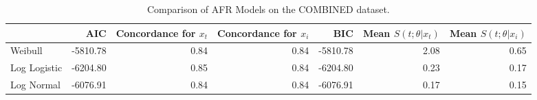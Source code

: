 \begin{table*}
\caption{Comparison of AFR Models on the COMBINED dataset.}
\label{tab:Combined}
\begin{tabular}{lrrrrrr}
\toprule
 & AIC & Concordance for $x_t$ & Concordance for $x_i$ & BIC & Mean $S(t;\theta|x_{t})$ & Mean $S(t;\theta|x_{i})$ \\
\midrule
Weibull & -5810.78 & 0.84 & 0.84 & -5810.78 & 2.08 & 0.65 \\
Log Logistic & -6204.80 & 0.85 & 0.84 & -6204.80 & 0.23 & 0.17 \\
Log Normal & -6076.91 & 0.84 & 0.84 & -6076.91 & 0.17 & 0.15 \\
\bottomrule
\end{tabular}
\end{table*}
